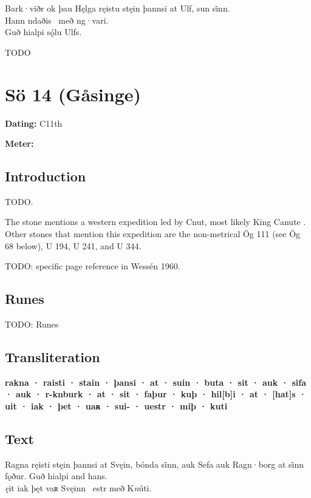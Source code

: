 \bpg\bpa[0]%
\startsub Bark·viðr ok þau Hęlga ręistu stęin þannsi at Ulf, sun si̇nn.\endsub \\
Hann ndaðis \hld\ með ng·vari. \\
Guð hialpi sǫ́lu Ulfs.\epa

\bpb TODO\epb\epg

\sectionline\clearpage


\section{Sö 14 (Gåsinge)}

\begin{flushright}%
\textbf{Dating:} C11th

\textbf{Meter:} \Fornyrdislag
\end{flushright}%

\subsection{Introduction}

TODO.

The stone mentions a western expedition led by Cnut, most likely King Canute \parencite{Wessen1960}.  Other stones that mention this expedition are the non-metrical Ög 111 (see Ög 68 below), U 194, U 241, and U 344.

TODO: specific page reference in Wessén 1960.

\subsection{Runes}

TODO: Runes%

\subsection{Transliteration}

\textbf{rakna · raisti · stain · þansi · at · suin · buta · sit · auk · sifa · auk · r-knburk · at · sit · faþur · kuþ · hil[b]i · at · [hat]s · uit · iak · þet · uaʀ · sui- · uestr · miþ · kuti}

\subsection{Text}

\bpg\bpa[0]%
\startsub Ragna ręisti stęin þannsi at Svęin, bónda si̇nn, auk Sefa auk Ragn·borg at si̇nn fǫður. Guð hialpi and hans.\endsub \\
\emph{ę}it iak þęt vaʀ Svęinn \hld\ estr með K\emph{n}úti. \epa

